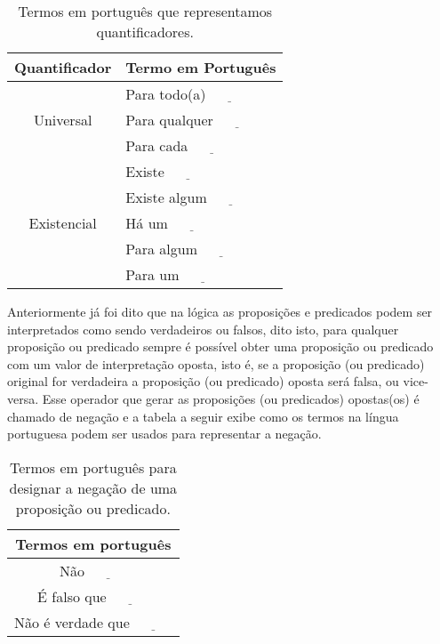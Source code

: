 \begin{table}[h]
	\centering
	\label{tab:QuantificadoresPT-BR}
	\begin{tabular}{cl}
		\hline
		\textbf{Quantificador} & \textbf{Termo em Portugu\^es} \\ \hline
		\multirow{3}{*}{Universal} & Para todo(a) $\underline{ \ \ \ \ \ \ \ \ \ \ \ \ }$\\
		& Para qualquer $\underline{ \ \ \ \ \ \ \ \ \ \ \ \ }$\\
		& Para cada $\underline{ \ \ \ \ \ \ \ \ \ \ \ \ }$\\ \hline
		\multirow{5}{*}{Existencial} & Existe $\underline{ \ \ \ \ \ \ \ \ \ \ \ \ }$\\
		& Existe algum $\underline{ \ \ \ \ \ \ \ \ \ \ \ \ }$\\
		& Há um $\underline{ \ \ \ \ \ \ \ \ \ \ \ \ }$\\
		& Para algum $\underline{ \ \ \ \ \ \ \ \ \ \ \ \ }$\\
		& Para um $\underline{ \ \ \ \ \ \ \ \ \ \ \ \ }$\\ \hline
	\end{tabular}
	\caption{Termos em português que representamos quantificadores.}
\end{table}

Anteriormente já foi dito que na lógica as proposições e predicados podem ser interpretados como sendo verdadeiros ou falsos, dito isto, para qualquer proposição ou predicado sempre é possível obter uma proposição ou predicado com um valor de interpretação oposta, isto é, se a proposição (ou predicado) original for verdadeira a proposição (ou predicado) oposta será falsa, ou vice-versa. Esse operador que gerar as proposições (ou predicados) opostas(os) é chamado de negação e a tabela a seguir exibe como os termos na língua portuguesa podem ser usados para representar a negação.

\begin{table}[h]
	\label{tab:NegacaoPortugues}
	\centering
	\begin{tabular}{c}
		\hline
		\textbf{Termos em português}\\
		\hline
		Não $\underline{ \ \ \ \ \ \ \ \ \ \ \ \ }$ \\
		É falso que $\underline{ \ \ \ \ \ \ \ \ \ \ \ \ }$\\
		Não é verdade que $\underline{ \ \ \ \ \ \ \ \ \ \ \ \ }$ \\ \hline
	\end{tabular}
	\caption{Termos em português para designar a negação de uma proposição ou predicado.}
\end{table}

